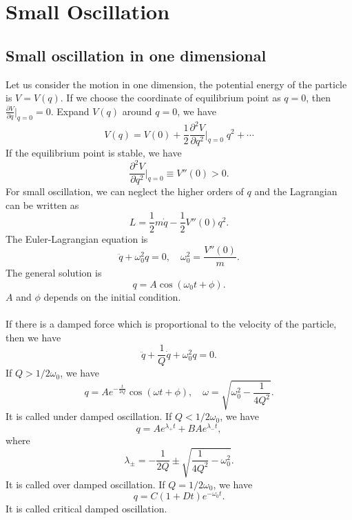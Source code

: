 \chapter{Small Oscillation}
\section{Small oscillation in one dimensional}
Let us consider the motion in one dimension, the potential energy of the particle is $V = V(q)$. If we choose the coordinate of equilibrium point as $q=0$, then $ \frac{\partial V}{\partial q} |_{q=0} = 0$. Expand $V(q)$ around $q=0$, we have
\[V(q) = V(0) + \frac{1}{2}  \frac{\partial^2 V}{\partial q^2} |_{q=0} \; q^2 + \cdots  \]
If the equilibrium point is stable, we have
\[\frac{\partial^2 V}{\partial q^2} |_{q=0} \equiv V''(0) > 0.\]
For small oscillation, we can neglect the higher orders of $q$ and the Lagrangian can be written as
\[L = \frac{1}{2}m\dot{q} - \frac{1}{2}V''(0)q^2.\]
The Euler-Lagrangian equation is
\[\ddot{q} + \omega_0^2 q = 0 ,\quad \omega_0^2 = \frac{V''(0)}{m}.\]
The general solution is
\[q = A\cos(\omega_0 t + \phi).\]
$A$ and $\phi$ depends on the initial condition. 
\\ \\
If there is a damped force which is proportional to the velocity of the particle, then we have
\[\ddot{q} + \frac{1}{Q}\dot{q} + \omega_0^2 q = 0.\]
If $Q > {1}/{2\omega_0}$, we have
\[q = A e^{-\frac{t}{2Q}} \cos(\omega t + \phi) ,\quad \omega = \sqrt{\omega_0^2 - \frac{1}{4Q^2}}.\]
It is called under damped oscillation.
If $Q < {1}/{2\omega_0}$, we have
\[q = Ae^{\lambda_+ t} + B Ae^{\lambda_- t},\]
where
\[\lambda_{\pm} = -\frac{1}{2Q} \pm \sqrt{\frac{1}{4Q^2} - \omega_0^2 }.\]
It is called over damped oscillation.
If $Q = {1}/{2\omega_0}$, we have
\[q = C(1+Dt)e^{-\omega_0 t}.\]
It is called critical damped oscillation.

